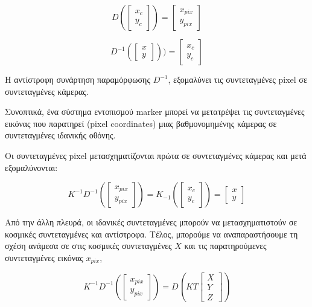 \begin{equation}
D
\left(
\begin{bmatrix}
x_{c}\\
y_{c}   
\end{bmatrix}
\right )
=
\begin{bmatrix}
x_{pix}\\
y_{pix}   
\end{bmatrix}
\end{equation} 


\begin{equation}
D^{-1}
\left (
\begin{bmatrix}
x\\
y  
\end{bmatrix}
\right )
)=
\begin{bmatrix}
x_{c}\\
y_{c}
\end{bmatrix}
\end{equation} 


Η αντίστροφη συνάρτηση παραμόρφωσης $D^{-1}$, εξομαλύνει τις συντεταγμένες pixel σε συντεταγμένες κάμερας.




Συνοπτικά, ένα σύστημα εντοπισμού marker μπορεί να μετατρέψει τις συντεταγμένες εικόνας που παρατηρεί (pixel coordinates) μιας βαθμονομημένης κάμερας σε συντεταγμένες ιδανικής οθόνης. 


Οι συντεταγμένες pixel μετασχηματίζονται πρώτα σε συντεταγμένες κάμερας και μετά εξομαλύνονται:

\begin{equation}
K^{-1}D^{-1} 
\left (\begin{bmatrix}
x_{pix}\\ 
y_{pix}
\end{bmatrix}  \right )
=K_{-1}
\left (\begin{bmatrix}
x_{c}\\ 
y_{c}
\end{bmatrix}  \right )
=
\begin{bmatrix}
x\\ 
y
\end{bmatrix}
\end{equation}

Από την άλλη πλευρά, οι ιδανικές συντεταγμένες μπορούν να μετασχηματιστούν σε κοσμικές συντεταγμένες και αντίστροφα. Τέλος, μπορούμε να αναπαραστήσουμε τη σχέση ανάμεσα σε στις κοσμικές συντεταγμένες $X$ και τις παρατηρούμενες συντεταγμένες εικόνας $x_{pix}$,

\begin{equation}
K^{-1}D^{-1} 
\left (\begin{bmatrix}
x_{pix}\\ 
y_{pix}
\end{bmatrix}  \right )
=D
\left (KT \begin{bmatrix}
X\\ 
Y\\
Z
\end{bmatrix}  \right )
\end{equation}


